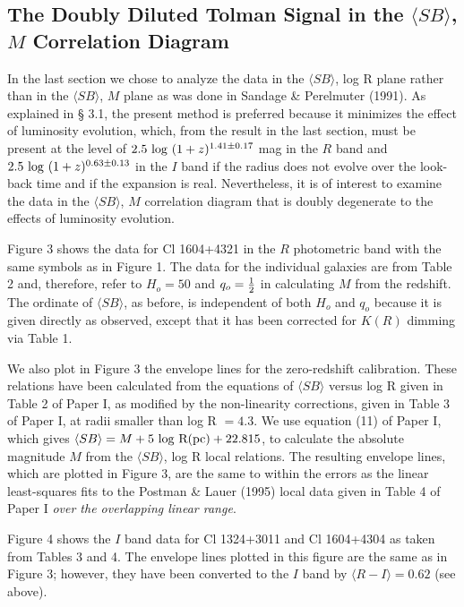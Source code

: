\documentclass[preprint]{aastex}
\begin{document}
\subsection{The Doubly Diluted Tolman Signal in the $\langle SB \rangle$, $M$
Correlation Diagram}

In the last section we chose to analyze the data in the $\langle SB
\rangle$, log R plane rather than in the $\langle SB \rangle$, $M$
plane as was done in Sandage \& Perelmuter (1991). As explained in \S
3.1, the present method is preferred because it minimizes the effect
of luminosity evolution, which, from the result in the last section,
must be present at the level of $2.5~{\rm log}~(1+z)^{1.41 \pm 0.17}$
mag in the $R$ band and $2.5~{\rm log}~(1+z)^{0.63 \pm 0.13}$ in the
$I$ band if the radius does not evolve over the look-back time and if
the expansion is real.  Nevertheless, it is of interest to examine the
data in the $\langle SB \rangle$, $M$ correlation diagram that is
doubly degenerate to the effects of luminosity evolution.

Figure 3 shows the data for Cl 1604+4321 in the $R$ photometric band
with the same symbols as in Figure 1. The data for the individual
galaxies are from Table 2 and, therefore, refer to $H_o = 50$ and $q_o
= {1\over{2}}$ in calculating $M$ from the redshift. The ordinate of
$\langle SB \rangle$, as before, is independent of both $H_o$ and
$q_o$ because it is given directly as observed, except that it has
been corrected for $K(R)$ dimming via Table 1.  

We also plot in Figure 3 the envelope lines for the zero-redshift
calibration. These relations have been calculated from the equations
of $\langle SB \rangle$ versus log R given in Table 2 of Paper I, as
modified by the non-linearity corrections, given in Table 3 of Paper
I, at radii smaller than log R $= 4.3$.  We use equation (11) of Paper
I, which gives $\langle SB \rangle = M + 5~{\rm log~R(pc)} + 22.815$,
to calculate the absolute magnitude $M$ from the $\langle SB \rangle$,
log R local relations.  The resulting envelope lines, which are
plotted in Figure 3, are the same to within the errors as the linear
least-squares fits to the Postman \& Lauer (1995) local data given in
Table 4 of Paper I {\it over the overlapping linear range}.

Figure 4 shows the $I$ band data for Cl 1324+3011 and Cl 1604+4304 as
taken from Tables 3 and 4. The envelope lines plotted in this figure
are the same as in Figure 3; however, they have been converted to the
$I$ band by $\langle R-I \rangle = 0.62$ (see above).
\end{document}
